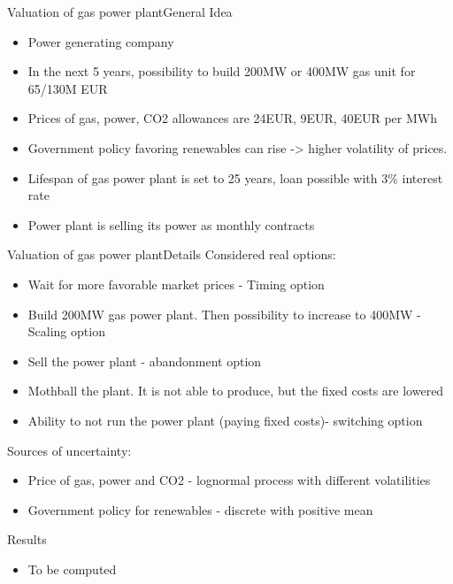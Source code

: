 \documentclass[us]{beamer}
\begin{document}
	
	\begin{frame}{Valuation of gas power plant}{General Idea}
	\begin{itemize}
		\item {Power generating company}
		\item {In the next 5 years, possibility to build 200MW or 400MW gas unit for 65/130M EUR}
		\item {Prices of gas, power, CO2 allowances are 24EUR, 9EUR, 40EUR per MWh}
		\item {Government policy favoring renewables can rise -> higher volatility of prices.}
		\item {Lifespan of gas power plant is set to 25 years, loan possible with 3\% interest rate}
		\item {Power plant is selling its power as monthly contracts}		
	\end{itemize}
	\end{frame}

	\begin{frame}{Valuation of gas power plant}{Details}
	Considered real options:
	\begin{itemize}
		\item {Wait for more favorable market prices - Timing option }
		\item {Build 200MW gas power plant. Then possibility to increase to 400MW - Scaling option}
		\item {Sell the power plant - abandonment option}
		\item {Mothball the plant. It is not able to produce, but the fixed costs are lowered} 
		\item {Ability to not run the power plant (paying fixed costs)- switching option}
	\end{itemize}
	
	Sources of uncertainty: 
	\begin{itemize}
		\item {Price of gas, power and CO2 - lognormal process with different volatilities}
		\item {Government policy for renewables  - discrete with positive mean}
	\end{itemize}	
	\end{frame}
	

	\begin{frame}{Results}
	\begin{itemize}
		\item {To be computed}
	\end{itemize}
	\end{frame}
\end{document}
